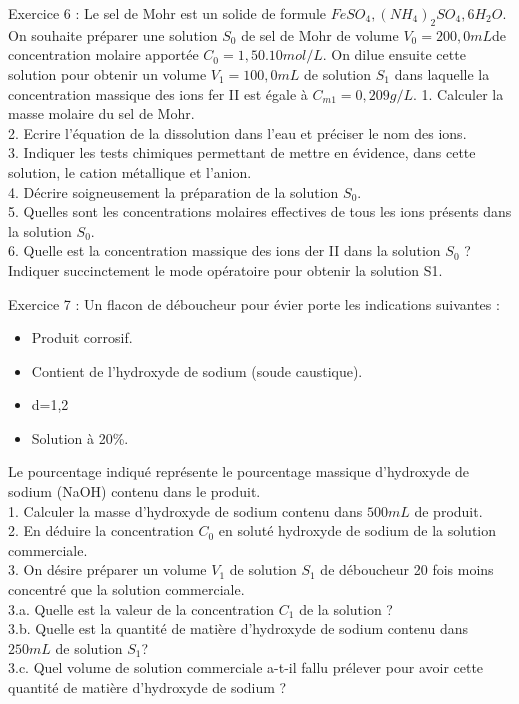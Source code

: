 \documentclass[12pt, french]{article}
\begin{document}

\begin{Box2}{Exercice 6 :}
Le sel de Mohr est un solide de formule $FeSO_4, (NH_4)_2SO_4, 6H_2O$. On souhaite préparer une solution $S_0$ de sel de Mohr de volume $V_0=200,0 mL$de concentration molaire apportée $C_0 = 1,50 . 10 mol / L.$
On dilue ensuite cette solution pour obtenir un volume $V_1 = 100,0 mL$ de solution $S_1$ dans laquelle la
   concentration massique des ions fer II est égale à $C_{m1}=0,209 g / L.$
1. Calculer la masse molaire du sel de Mohr.\\
2. Ecrire l’équation de la dissolution dans l’eau et préciser le nom des ions.\\
3. Indiquer les tests chimiques permettant de mettre en évidence, dans cette solution, le cation métallique et
l’anion.\\
4. Décrire soigneusement la préparation de la solution $S_0$.\\
5. Quelles sont les concentrations molaires effectives de tous les ions présents dans la solution $S_0$.\\
   6. Quelle est la concentration massique des ions der II dans la solution $S_0$ ? Indiquer succinctement le mode
opératoire pour obtenir la solution S1.

\end{Box2}



\begin{Box2}{Exercice 7 : }
Un flacon de déboucheur pour évier porte les indications suivantes :
   \begin{itemize}
      \item Produit corrosif.
      \item Contient de l’hydroxyde de sodium (soude caustique).
      \item d=1,2
      \item Solution à 20\%.
   \end{itemize}
Le pourcentage indiqué représente le pourcentage massique d’hydroxyde de sodium (NaOH) contenu dans
le produit.\\
1. Calculer la masse d’hydroxyde de sodium contenu dans $500 mL$ de produit.\\
2. En déduire la concentration $C_0$ en soluté hydroxyde de sodium de la solution commerciale.\\
3. On désire préparer un volume $V_1$ de solution $S_1$ de déboucheur 20 fois moins concentré que la solution commerciale.\\
3.a. Quelle est la valeur de la concentration $C_1$ de la solution ?\\
3.b. Quelle est la quantité de matière d’hydroxyde de sodium contenu dans $250 mL$ de solution $S_1$?\\
3.c. Quel volume de solution commerciale a-t-il fallu prélever pour avoir cette quantité de matière
d’hydroxyde de sodium ?\\
\end{Box2}
\end{document}
